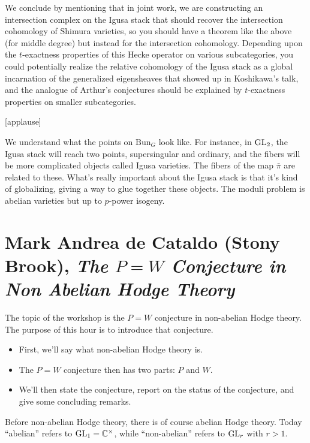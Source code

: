 \documentclass[reqno]{amsart} 
\begin{document}
We conclude by mentioning that in joint work, we are constructing an intersection complex on the Igusa stack that should recover the intersection cohomology of Shimura varieties, so you should have a theorem like the above (for middle degree) but instead for the intersection cohomology.  Depending upon the $t$-exactness properties of this Hecke operator on various subcategories, you could potentially realize the relative cohomology of the Igusa stack as a global incarnation of the generalized eigensheaves that showed up in Koshikawa's talk, and the analogue of Arthur's conjectures should be explained by $t$-exactness properties on smaller subcategories.

[applause]

\begin{remark}
  We understand what the points on $\mathrm{Bun}_G$ look like.  For instance, in $\operatorname{GL}_2$, the Igusa stack will reach two points, supersingular and ordinary, and the fibers will be more complicated objects called Igusa varieties.  The fibers of the map $\bar{\pi}$ are related to these.  What's really important about the Igusa stack is that it's kind of globalizing, giving a way to glue together these objects.  The moduli problem is abelian varieties but up to $p$-power isogeny.
\end{remark}


\part{Mark Andrea de Cataldo (Stony Brook), \emph{The $P=W$ Conjecture in Non Abelian Hodge Theory}}


The topic of the workshop is the $P = W$ conjecture in non-abelian Hodge theory.  The purpose of this hour is to introduce that conjecture.
\begin{itemize}
\item First, we'll say what non-abelian Hodge theory is.  
\item The $P = W$ conjecture then has two parts: $P$ and $W$.
\item We'll then state the conjecture, report on the status of the conjecture, and give some concluding remarks.
\end{itemize}

Before non-abelian Hodge theory, there is of course abelian Hodge theory.  Today ``abelian'' refers to $\operatorname{GL}_1 = \mathbb{C}^\times$, while ``non-abelian'' refers to $\operatorname{GL}_r$ with $r > 1$.
\end{document}
